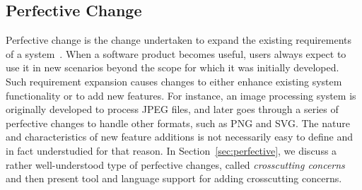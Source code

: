 \subsection{Perfective Change}

Perfective change is the change undertaken to expand the existing requirements of a system~\cite{Seaman2008:SMC}. When a software product becomes useful, users always expect to use it in new scenarios beyond the scope for which it was initially developed. Such requirement expansion causes changes to either enhance existing system functionality or to add new features. For instance, an image processing system is originally developed to process JPEG files, and later goes through a series of perfective changes to handle other formats, such as PNG and SVG. The nature and characteristics of new feature additions is not necessarily easy to define and in fact understudied for that reason. In Section~\ref{sec:perfective}, we discuss a rather well-understood type of perfective changes, called {\em crosscutting concerns} and then present tool and language support for adding crosscutting concerns. 

